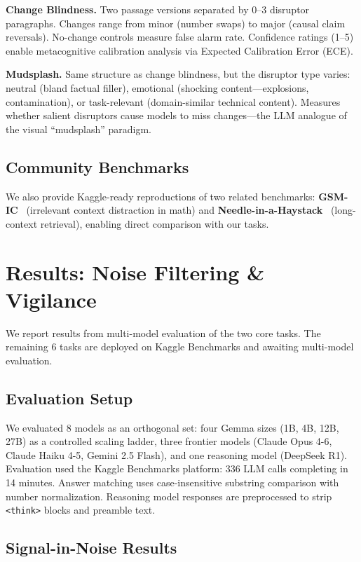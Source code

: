\documentclass[11pt,twocolumn]{article}
\begin{document}
\textbf{Change Blindness.} Two passage versions separated by 0--3 disruptor paragraphs. Changes range from minor (number swaps) to major (causal claim reversals). No-change controls measure false alarm rate. Confidence ratings (1--5) enable metacognitive calibration analysis via Expected Calibration Error (ECE).

\textbf{Mudsplash.} Same structure as change blindness, but the disruptor type varies: neutral (bland factual filler), emotional (shocking content---explosions, contamination), or task-relevant (domain-similar technical content). Measures whether salient disruptors cause models to miss changes---the LLM analogue of the visual ``mudsplash'' paradigm.

\subsection{Community Benchmarks}

We also provide Kaggle-ready reproductions of two related benchmarks: \textbf{GSM-IC}~\citep{shi2023} (irrelevant context distraction in math) and \textbf{Needle-in-a-Haystack}~\citep{kamradt2023niah} (long-context retrieval), enabling direct comparison with our tasks.

\section{Results: Noise Filtering \& Vigilance}

We report results from multi-model evaluation of the two core tasks. The remaining 6 tasks are deployed on Kaggle Benchmarks and awaiting multi-model evaluation.

\subsection{Evaluation Setup}

We evaluated 8 models as an orthogonal set: four Gemma sizes (1B, 4B, 12B, 27B) as a controlled scaling ladder, three frontier models (Claude Opus 4-6, Claude Haiku 4-5, Gemini 2.5 Flash), and one reasoning model (DeepSeek R1). Evaluation used the Kaggle Benchmarks platform: 336 LLM calls completing in 14 minutes. Answer matching uses case-insensitive substring comparison with number normalization. Reasoning model responses are preprocessed to strip \texttt{<think>} blocks and preamble text.

\subsection{Signal-in-Noise Results}
\end{document}
